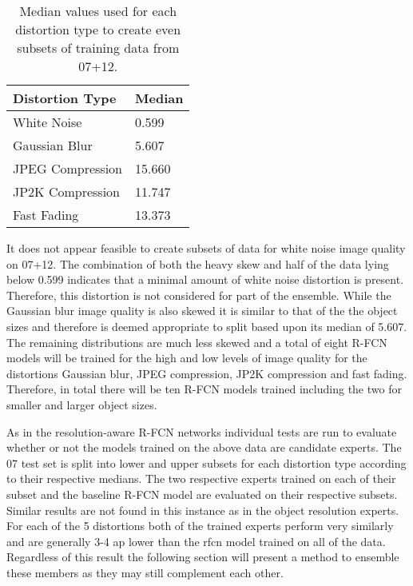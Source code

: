 \documentclass[a4paper,twoside]{article}
\begin{document}
\begin{table}[h]
\centering
\caption{Median values used for each distortion type to create even subsets of training data from 07+12.}
\label{tab:iq_splits}
\begin{tabular}{|l|l|}
\hline
\textbf{Distortion Type}   & \textbf{Median} \\ \hline
White Noise       & 0.599  \\ \hline
Gaussian Blur     & 5.607  \\ \hline
JPEG Compression  & 15.660 \\ \hline
JP2K Compression & 11.747 \\ \hline
Fast Fading       & 13.373 \\ \hline
\end{tabular}
\end{table}

It does not appear feasible to create subsets of data for white noise image quality on 07+12. The combination of both the heavy skew and half of the data lying below 0.599 indicates that a minimal amount of white noise distortion is present. Therefore, this distortion is not considered for part of the ensemble. While the Gaussian blur image quality is also skewed it is similar to that of the the object sizes and therefore is deemed appropriate to split based upon its median of 5.607. The remaining distributions are much less skewed and a total of eight R-FCN models will be trained for the high and low levels of image quality for the distortions Gaussian blur, JPEG compression, JP2K compression and fast fading. Therefore, in total there will be ten R-FCN models trained including the two for smaller and larger object sizes.

As in the resolution-aware R-FCN networks individual tests are run to evaluate whether or not the models trained on the above data are candidate experts. The 07 test set is split into lower and upper subsets for each distortion type according to their respective medians. The two respective experts trained on each of their subset and the baseline R-FCN model are evaluated on their respective subsets. Similar results are not found in this instance as in the object resolution experts. For each of the 5 distortions both of the trained experts perform very similarly and are generally 3-4 \gls{ap} lower than the \gls{rfcn} model trained on all of the data. Regardless of this result the following section will present a method to ensemble these members as they may still complement each other. 
\end{document}
